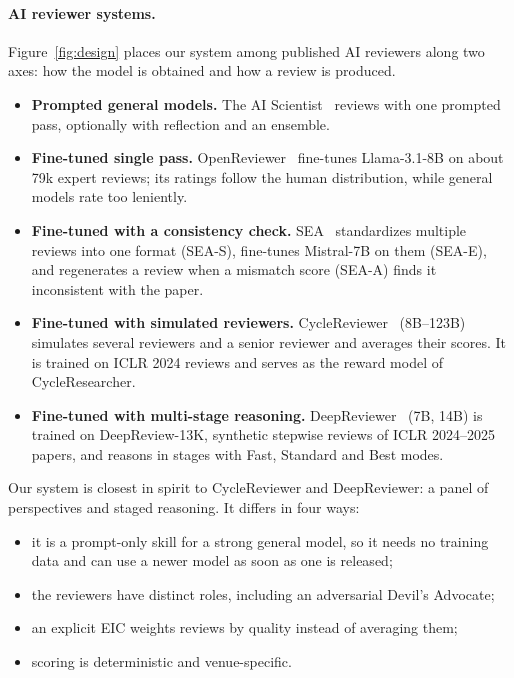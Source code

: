 \documentclass[11pt,a4paper]{article}
\begin{document}
\paragraph{AI reviewer systems.}
Figure~\ref{fig:design} places our system among published AI reviewers along two axes: how the
model is obtained and how a review is produced.
\begin{itemize}
\item \textbf{Prompted general models.} The AI Scientist~\citep{lu2024aiscientist} reviews with one
prompted pass, optionally with reflection and an ensemble.
\item \textbf{Fine-tuned single pass.} OpenReviewer~\citep{idahl2025openreviewer} fine-tunes
Llama-3.1-8B on about 79k expert reviews; its ratings follow the human distribution, while general
models rate too leniently.
\item \textbf{Fine-tuned with a consistency check.} SEA~\citep{yu2024sea} standardizes multiple
reviews into one format (SEA-S), fine-tunes Mistral-7B on them (SEA-E), and regenerates a review
when a mismatch score (SEA-A) finds it inconsistent with the paper.
\item \textbf{Fine-tuned with simulated reviewers.} CycleReviewer~\citep{weng2025cycleresearcher}
(8B--123B) simulates several reviewers and a senior reviewer and averages their scores. It is
trained on ICLR 2024 reviews and serves as the reward model of CycleResearcher.
\item \textbf{Fine-tuned with multi-stage reasoning.} DeepReviewer~\citep{zhu2025deepreview}
(7B, 14B) is trained on DeepReview-13K, synthetic stepwise reviews of ICLR 2024--2025 papers, and
reasons in stages with Fast, Standard and Best modes.
\end{itemize}
Our system is closest in spirit to CycleReviewer and DeepReviewer: a panel of perspectives and
staged reasoning. It differs in four ways:
\begin{itemize}
\item it is a prompt-only skill for a strong general model, so it needs no training data and can
use a newer model as soon as one is released;
\item the reviewers have distinct roles, including an adversarial Devil's Advocate;
\item an explicit EIC weights reviews by quality instead of averaging them;
\item scoring is deterministic and venue-specific.
\end{itemize}
\end{document}
